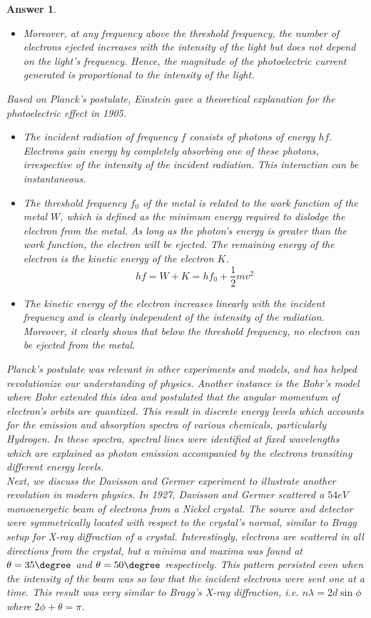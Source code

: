 \documentclass[a4paper]{article}
\newtheorem{ans}{Answer}[subsection]
\theoremstyle{new}
\begin{document}
\begin{ans}
\begin{itemize}
\item Moreover, at any frequency above the threshold frequency, the number of electrons ejected increases with the intensity of the light but does not depend on the light's frequency. Hence, the magnitude of the photoelectric current generated is proportional to the intensity of the light.
\end{itemize} 
Based on Planck's postulate, Einstein gave a theoretical explanation for the photoelectric effect in 1905.
\begin{itemize}
\item The incident radiation of frequency $f$ consists of photons of energy $hf$. Electrons gain energy by completely absorbing one of these photons, irrespective of the intensity of the incident radiation. This interaction can be instantaneous.
\item The threshold frequency $f_0$ of the metal is related to the work function of the metal $W$, which is defined as the minimum energy required to dislodge the electron from the metal. As long as the photon's energy is greater than the work function, the electron will be ejected. The remaining energy of the electron is the kinetic energy of the electron $K$.
$$hf=W+K=hf_0+\frac{1}{2}mv^2$$
\item The kinetic energy of the electron increases linearly with the incident frequency and is clearly independent of the intensity of the radiation. Moreover, it clearly shows that below the threshold frequency, no electron can be ejected from the metal.
\end{itemize}
Planck's postulate was relevant in other experiments and models, and has helped revolutionize our understanding of physics. Another instance is the Bohr's model where Bohr extended this idea and postulated that the angular momentum of electron's orbits are quantized. This result in discrete energy levels which accounts for the emission and absorption spectra of various chemicals, particularly Hydrogen. In these spectra, spectral lines were identified at fixed wavelengths which are explained as photon emission accompanied by the electrons transiting different energy levels.\\[5pt]
Next, we discuss the Davisson and Germer experiment to illustrate another revolution in modern physics. In 1927, Davisson and Germer scattered a $54eV$ monoenergetic beam of electrons from a Nickel crystal. The source and detector were symmetrically located with respect to the crystal's normal, similar to Bragg setup for X-ray diffraction of a crystal. Interestingly, electrons are scattered in all directions from the crystal, but a minima and maxima was found at $\theta = 35\degree$ and $\theta=50\degree$ respectively. This pattern persisted even when the intensity of the beam was so low that the incident electrons were sent one at a time. This result was very similar to Bragg's X-ray diffraction, i.e. $n\lambda=2d\sin\phi $ where $2\phi+\theta=\pi$.\\[5pt]

\end{ans}
\end{document}
